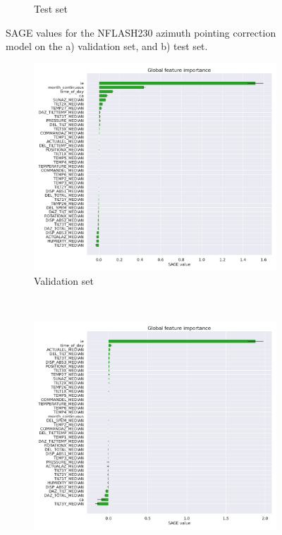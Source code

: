 \begin{figure}[H]
\begin{subfigure}[t]{0.92\textwidth}
       \caption{Test set}
       \label{subfig:sage_lastfold_nflash230_az_test}
    \end{subfigure}
    \caption{SAGE values for the NFLASH230 azimuth pointing correction model on the a) validation set, and b) test set.}
    \label{fig:sage_lastfold_nflash230_az}
\end{figure}

\begin{figure}[H]
    \centering
    \begin{subfigure}[t]{0.92\textwidth}
        \centering
        \includegraphics[width=\textwidth]{Results/XGB_ds2_tp5_k40_uncorr_el_val_SAGE.pdf}
        \caption{Validation set}
        \label{subfig:sage_lastfold_nflash230_el_val}
    \end{subfigure}
    \\
    \begin{subfigure}[t]{0.92\textwidth}
       \centering
       \includegraphics[width=1\textwidth]{Results/XGB_ds2_tp5_k40_uncorr_el_test_SAGE.pdf}

\end{subfigure}
\end{figure}
